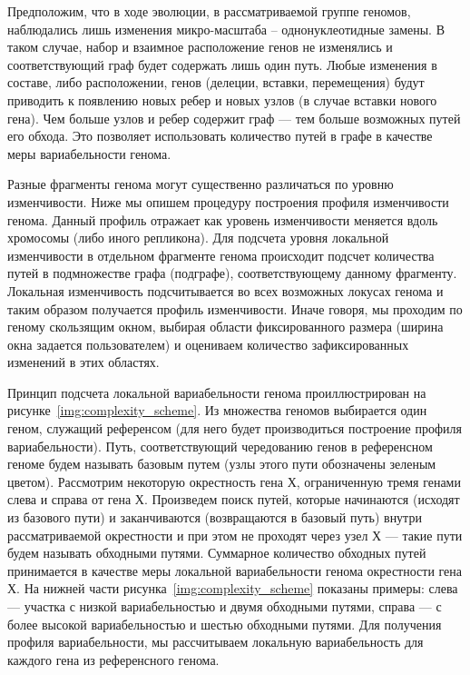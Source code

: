 Предположим, что в ходе эволюции, в рассматриваемой группе геномов, наблюдались лишь изменения микро-масштаба -- однонуклеотидные замены. В таком случае, набор и взаимное расположение генов не изменялись и соответствующий граф будет содержать лишь один путь. Любые изменения в составе, либо расположении, генов (делеции, вставки, перемещения) будут приводить к появлению новых ребер и новых узлов (в случае вставки нового гена). Чем больше узлов и ребер содержит граф --- тем больше возможных путей его обхода. Это позволяет использовать количество путей в графе в качестве меры вариабельности генома.

Разные фрагменты генома могут существенно различаться по уровню изменчивости. Ниже мы опишем процедуру построения профиля изменчивости генома. Данный профиль отражает как уровень изменчивости меняется вдоль хромосомы (либо иного репликона). Для подсчета уровня локальной изменчивости в отдельном фрагменте генома происходит подсчет количества путей в подмножестве графа (подграфе), соответствующему данному фрагменту. Локальная изменчивость подсчитывается во всех возможных локусах генома и таким образом получается профиль изменчивости. Иначе говоря, мы проходим по геному скользящим окном, выбирая области фиксированного размера (ширина окна задается пользователем) и оцениваем количество зафиксированных изменений в этих областях.

Принцип подсчета локальной вариабельности генома проиллюстрирован на рисунке~\ref{img:complexity_scheme}. Из множества геномов выбирается один геном, служащий референсом (для него будет производиться построение профиля вариабельности). Путь, соответствующий чередованию генов в референсном геноме будем называть базовым путем (узлы этого пути обозначены зеленым цветом). Рассмотрим некоторую окрестность гена Х, ограниченную тремя генами слева и справа от гена Х. Произведем поиск путей, которые начинаются (исходят из базового пути) и заканчиваются (возвращаются в базовый путь) внутри рассматриваемой окрестности и при этом не проходят через узел Х --- такие пути будем называть обходными путями. Суммарное количество обходных путей принимается в качестве меры локальной вариабельности генома окрестности гена Х. На нижней части рисунка~\ref{img:complexity_scheme} показаны примеры: слева --- участка с низкой вариабельностью и двумя обходными путями, справа --- с более высокой вариабельностью и шестью обходными путями. Для получения профиля вариабельности, мы рассчитываем локальную вариабельность для каждого гена из референсного генома.  

